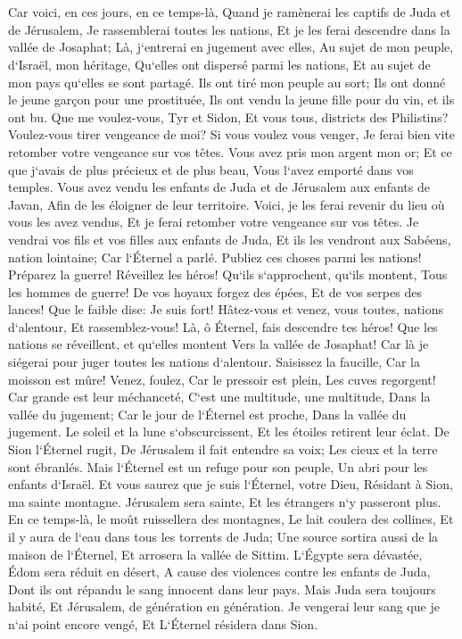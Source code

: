 \chapter{}

\verse Car voici, en ces jours, en ce temps-là, Quand je ramènerai les captifs de Juda et de Jérusalem, 
\verse Je rassemblerai toutes les nations, Et je les ferai descendre dans la vallée de Josaphat; Là, j`entrerai en jugement avec elles, Au sujet de mon peuple, d`Israël, mon héritage, Qu`elles ont dispersé parmi les nations, Et au sujet de mon pays qu`elles se sont partagé. 
\verse Ils ont tiré mon peuple au sort; Ils ont donné le jeune garçon pour une prostituée, Ils ont vendu la jeune fille pour du vin, et ils ont bu. 
\verse Que me voulez-vous, Tyr et Sidon, Et vous tous, districts des Philistins? Voulez-vous tirer vengeance de moi? Si vous voulez vous venger, Je ferai bien vite retomber votre vengeance sur vos têtes. 
\verse Vous avez pris mon argent mon or; Et ce que j`avais de plus précieux et de plus beau, Vous l`avez emporté dans vos temples. 
\verse Vous avez vendu les enfants de Juda et de Jérusalem aux enfants de Javan, Afin de les éloigner de leur territoire. 
\verse Voici, je les ferai revenir du lieu où vous les avez vendus, Et je ferai retomber votre vengeance sur vos têtes. 
\verse Je vendrai vos fils et vos filles aux enfants de Juda, Et ils les vendront aux Sabéens, nation lointaine; Car l`Éternel a parlé. 
\verse Publiez ces choses parmi les nations! Préparez la guerre! Réveillez les héros! Qu`ils s`approchent, qu`ils montent, Tous les hommes de guerre! 
\verse De vos hoyaux forgez des épées, Et de vos serpes des lances! Que le faible dise: Je suis fort! 
\verse Hâtez-vous et venez, vous toutes, nations d`alentour, Et rassemblez-vous! Là, ô Éternel, fais descendre tes héros! 
\verse Que les nations se réveillent, et qu`elles montent Vers la vallée de Josaphat! Car là je siégerai pour juger toutes les nations d`alentour. 
\verse Saisissez la faucille, Car la moisson est mûre! Venez, foulez, Car le pressoir est plein, Les cuves regorgent! Car grande est leur méchanceté, 
\verse C`est une multitude, une multitude, Dans la vallée du jugement; Car le jour de l`Éternel est proche, Dans la vallée du jugement. 
\verse Le soleil et la lune s`obscurcissent, Et les étoiles retirent leur éclat. 
\verse De Sion l`Éternel rugit, De Jérusalem il fait entendre sa voix; Les cieux et la terre sont ébranlés. Mais l`Éternel est un refuge pour son peuple, Un abri pour les enfants d`Israël. 
\verse Et vous saurez que je suis l`Éternel, votre Dieu, Résidant à Sion, ma sainte montagne. Jérusalem sera sainte, Et les étrangers n`y passeront plus. 
\verse En ce temps-là, le moût ruissellera des montagnes, Le lait coulera des collines, Et il y aura de l`eau dans tous les torrents de Juda; Une source sortira aussi de la maison de l`Éternel, Et arrosera la vallée de Sittim. 
\verse L`Égypte sera dévastée, Édom sera réduit en désert, A cause des violences contre les enfants de Juda, Dont ils ont répandu le sang innocent dans leur pays. 
\verse Mais Juda sera toujours habité, Et Jérusalem, de génération en génération. 
\verse Je vengerai leur sang que je n`ai point encore vengé, Et L`Éternel résidera dans Sion. 
